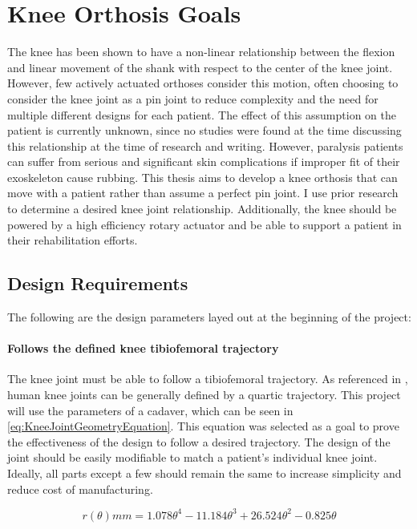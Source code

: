 \chapter{Knee Orthosis Goals}
The knee has been shown to have a non-linear relationship between the flexion and linear movement of the shank with respect to the center of the knee joint. However, few actively actuated orthoses consider this motion, often choosing to consider the knee joint as a pin joint to reduce complexity and the need for multiple different designs for each patient. The effect of this assumption on the patient is currently unknown, since no studies were found at the time discussing this relationship at the time of research and writing. However, paralysis patients can suffer from serious and significant skin complications if improper fit of their exoskeleton cause rubbing. This thesis aims to develop a knee orthosis that can move with a patient rather than assume a perfect pin joint. I use prior research to determine a desired knee joint relationship. Additionally, the knee should be powered by a high efficiency rotary actuator and be able to support a patient in their rehabilitation efforts.

\section{Design Requirements}
\label{sec:DesignParams}
The following are the design parameters layed out at the beginning of the project:

\subsubsection{Follows the defined knee tibiofemoral trajectory}
The knee joint must be able to follow a tibiofemoral trajectory. As referenced in \cite{KinDynKneeJoint}, human knee joints can be generally defined by a quartic trajectory. This project will use the parameters of a cadaver, which can be seen in \autoref{eq:KneeJointGeometryEquation}. This equation was selected as a goal to prove the effectiveness of the design to follow a desired trajectory. The design of the joint should be easily modifiable to match a patient's individual knee joint. Ideally, all parts except a few should remain the same to increase simplicity and reduce cost of manufacturing.

\begin{equation}
    r(\theta) mm = 1.078\theta^4 - 11.184\theta^3 + 26.524\theta^2 - 0.825\theta
    \label{eq:KneeJointGeometryEquation}
\end{equation}

